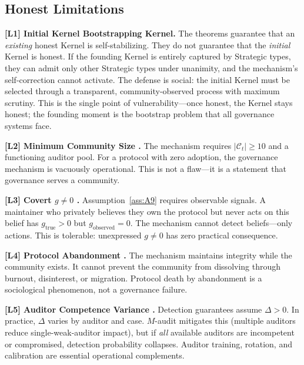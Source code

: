 \documentclass[12pt,a4paper]{article}
\theoremstyle{definition}
\newcommand{\Contributors}{\mathcal{C}}
\newcommand{\limitationTag}[1]{\textsf{\textbf{[L#1]}}}
\newcommand{\gnonzero}{g \neq 0}
\begin{document}
\subsection{Honest Limitations}
\begin{enumerate}[label=\limitationTag{\arabic*},leftmargin=*]
    \item \textbf{\limitationTag{1} Initial Kernel Bootstrapping Kernel.} The theorems guarantee that an \textit{existing} honest Kernel is self-stabilizing. They do not guarantee that the \textit{initial} Kernel is honest. If the founding Kernel is entirely captured by Strategic types, they can admit only other Strategic types under unanimity, and the mechanism's self-correction cannot activate. The defense is social: the initial Kernel must be selected through a transparent, community-observed process with maximum scrutiny. This is the single point of vulnerability---once honest, the Kernel stays honest; the founding moment is the bootstrap problem that all governance systems face.
    \item \textbf{\limitationTag{2} Minimum Community Size .} The mechanism requires $|\Contributors_t| \geq 10$ and a functioning auditor pool. For a protocol with zero adoption, the governance mechanism is vacuously operational. This is not a flaw---it is a statement that governance serves a community.
    \item \textbf{\limitationTag{3} Covert $\gnonzero$ .} Assumption~\ref{ass:A9} requires observable signals. A maintainer who privately believes they own the protocol but never acts on this belief has $g_{\mathrm{true}} > 0$ but $g_{\text{observed}} = 0$. The mechanism cannot detect beliefs---only actions. This is tolerable: unexpressed $\gnonzero$ has zero practical consequence.
    \item \textbf{\limitationTag{4} Protocol Abandonment .} The mechanism maintains integrity while the community exists. It cannot prevent the community from dissolving through burnout, disinterest, or migration. Protocol death by abandonment is a sociological phenomenon, not a governance failure.
    \item \textbf{\limitationTag{5} Auditor Competence Variance .} Detection guarantees assume $\Delta > 0$. In practice, $\Delta$ varies by auditor and case. $M$-audit mitigates this (multiple auditors reduce single-weak-auditor impact), but if \textit{all} available auditors are incompetent or compromised, detection probability collapses. Auditor training, rotation, and calibration are essential operational complements.

\end{enumerate}
\end{document}
